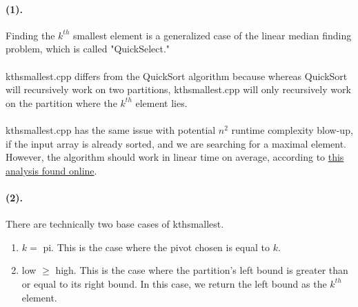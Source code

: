 \documentclass{article}
\begin{document}
\paragraph{(1).}Finding the $k^{th}$ smallest element is a generalized case of the linear median finding problem,
which is called "QuickSelect."

\paragraph{}kthsmallest.cpp differs from the QuickSort algorithm because whereas QuickSort will recursively
work on two partitions, kthsmallest.cpp will only recursively work on the partition where the $k^{th}$ element
lies.

\paragraph{}kthsmallest.cpp has the same issue with potential $n^2$ runtime complexity blow-up, if the
input array is already sorted, and we are searching for a maximal element. However, the algorithm should work
in linear time on average, according to \href{https://11011110.github.io/blog/2007/10/09/blum-style-analysis-of.html}{this analysis found online}.

\paragraph{(2).}There are technically two base cases of kthsmallest.
\begin{enumerate}
    \item $k = $ pi. This is the case where the pivot chosen is equal to $k$.
    \item low $\ge$ high. This is the case where the partition's left bound is greater than or equal to its
        right bound. In this case, we return the left bound as the $k^{th}$ element.
\end{enumerate}
\end{document}
